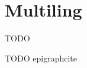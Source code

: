 \documentclass[../thesis.tex]{subfiles}
\begin{document}
\chapter{Multiling}
\label{ch:multiling}

\epigraph{
  TODO
}{
  TODO epigraphcite
}
\end{document}
